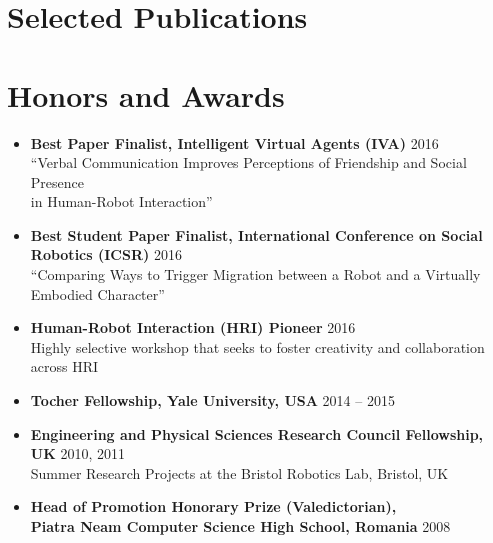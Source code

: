 \documentclass[10pt,letterpaper]{article}
\newcommand{\thing}[2]{{#1} \hfill {#2}}
\begin{document}
\vspace{-1.1em}
\section{Selected Publications}
\vspace{-0.5em}
\nocite{*} %
\setlength{\biblabelsep}{0.5em} %
\printbibliography[heading=none,keyword=publication]

\vspace{-1.2em}
\section{Honors and Awards}
\vspace{-0.5em}
\begin{itemize}%
\item \thing{\bf Best Paper Finalist, Intelligent Virtual Agents (IVA)}{2016}\\
	``Verbal Communication Improves Perceptions of Friendship and Social Presence \\
	 in Human-Robot Interaction''
\item \thing{\bf Best Student Paper Finalist, International Conference on Social Robotics (ICSR)}{2016}\\
	``Comparing Ways to Trigger Migration between a Robot
	 and a Virtually Embodied Character''
\item \thing{\bf Human-Robot Interaction (HRI) Pioneer}{2016}\\
	 Highly selective workshop that seeks to foster creativity and collaboration across HRI
\item \thing{\bf Tocher Fellowship, Yale University, USA}{2014 -- 2015}
\item \thing{\bf Engineering and Physical Sciences Research Council Fellowship, UK}{2010, 2011}\\
	Summer Research Projects at the Bristol Robotics Lab, Bristol, UK
\item \thing{\bf Head of Promotion Honorary Prize (Valedictorian),\\Piatra Neam\cb{t} Computer Science High School, Romania}{2008}
\end{itemize}
\end{document}
